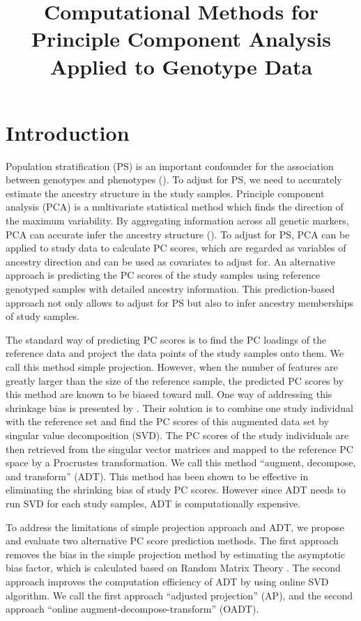 \documentclass{article}
\title{Computational Methods for Principle Component Analysis Applied to
  Genotype Data}
\date{}
\begin{document}
\maketitle

\section{Introduction}

Population stratification (PS) is an important confounder for the association  between
genotypes and phenotypes (\cite{price}). To adjust for PS, we need to accurately estimate the ancestry structure in the study samples. Principle component analysis (PCA) is a multivariate statistical method which finds the direction of the maximum variability. By aggregating information across all genetic markers, PCA can accurate infer the ancestry structure  (\cite{reich}). To adjust for PS, PCA can be applied to study data to calculate PC scores, which are regarded as variables of ancestry direction and can be used as covariates to adjust for. An alternative approach is predicting the PC scores of the study samples using reference genotyped samples with detailed ancestry information.
This prediction-based approach not only allows to adjust for PS but also to infer ancestry memberships of study samples. 

The standard way of predicting PC scores is to find the PC loadings of the reference data and project the data points of the study samples onto them.
We call this method simple projection.
However, when the number of features are greatly larger than the size of the reference sample,
the predicted PC scores by this method are known to be biased toward null.
One way of addressing this shrinkage bias is presented by \cite{wang}.
Their solution is to combine one study individual with the reference set and
find the PC scores of this augmented data set by singular value decomposition (SVD).
The PC scores of the study individuals are then retrieved from the singular vector matrices and mapped to the reference PC space by a Procrustes transformation.
We call this method ``augment, decompose, and transform'' (ADT).
This method has been shown to be effective in eliminating the shrinking bias of
study PC scores.
However since ADT needs to run SVD for each study samples, ADT is computationally expensive.

To address the limitations of simple projection approach and ADT, we propose and evaluate two alternative PC score prediction methods.
The first approach removes the bias in the simple projection method by estimating the asymptotic bias factor, which is calculated based on Random Matrix Theory \cite{dey}.
The second approach improves the computation efficiency of ADT by using online SVD algorithm. 
We call the first approach ``adjusted projection'' (AP), and the second approach ``online augment-decompose-transform'' (OADT). 
\end{document}
